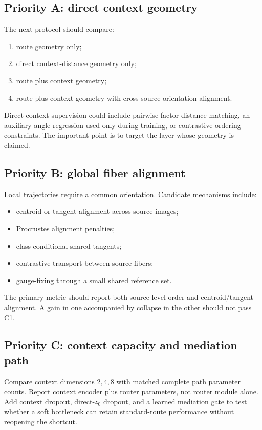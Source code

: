 \documentclass[11pt,a4paper]{article}
\begin{document}
\subsection{Priority A: direct context geometry}

The next protocol should compare:

\begin{enumerate}
\item route geometry only;
\item direct context-distance geometry only;
\item route plus context geometry;
\item route plus context geometry with cross-source orientation alignment.
\end{enumerate}

Direct context supervision could include pairwise factor-distance matching, an auxiliary angle regression used only during training, or contrastive ordering constraints. The important point is to target the layer whose geometry is claimed.

\subsection{Priority B: global fiber alignment}

Local trajectories require a common orientation. Candidate mechanisms include:

\begin{itemize}
\item centroid or tangent alignment across source images;
\item Procrustes alignment penalties;
\item class-conditional shared tangents;
\item contrastive transport between source fibers;
\item gauge-fixing through a small shared reference set.
\end{itemize}

The primary metric should report both source-level order and centroid/tangent alignment. A gain in one accompanied by collapse in the other should not pass C1.

\subsection{Priority C: context capacity and mediation path}

Compare context dimensions $2,4,8$ with matched complete path parameter counts. Report context encoder plus router parameters, not router module alone. Add context dropout, direct-$z_0$ dropout, and a learned mediation gate to test whether a soft bottleneck can retain standard-route performance without reopening the shortcut.
\end{document}
